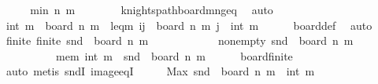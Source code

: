 \begin{isabellebody}
\ \ \isamarkupfalse%
\ \isamarkupfalse%
\ {\isachardoublequoteopen}min\ n\ m\ {\isasymge}\ {}{\isachardoublequoteclose}\isanewline
\ \ \ \ \isamarkupfalse%
\ knights{\isacharunderscore}{\kern0pt}path{\isacharunderscore}{\kern0pt}board{\isacharunderscore}{\kern0pt}m{\isacharunderscore}{\kern0pt}n{\isacharunderscore}{\kern0pt}geq{\isacharunderscore}{\kern0pt}{}\ \isamarkupfalse%
\ auto\isanewline
\ \ \isamarkupfalse%
\ \isamarkupfalse%
\ {\isachardoublequoteopen}{\isacharparenleft}{\kern0pt}{}{\isacharcomma}{\kern0pt}int\ m{\isacharparenright}{\kern0pt}\ {\isasymin}\ board\ n\ m{\isachardoublequoteclose}\ \ leq{\isacharunderscore}{\kern0pt}m{\isacharcolon}{\kern0pt}\ {\isachardoublequoteopen}{\isasymforall}{\isacharparenleft}{\kern0pt}i{\isacharcomma}{\kern0pt}j{\isacharparenright}{\kern0pt}\ {\isasymin}\ board\ n\ m{\isachardot}{\kern0pt}\ j\ {\isasymle}\ int\ m{\isachardoublequoteclose}\isanewline
\ \ \ \ \isamarkupfalse%
\ board{\isacharunderscore}{\kern0pt}def\ \isamarkupfalse%
\ auto\isanewline
\ \ \isamarkupfalse%
\ \isamarkupfalse%
\ finite{\isacharcolon}{\kern0pt}\ {\isachardoublequoteopen}finite\ {\isacharparenleft}{\kern0pt}{\isacharparenleft}{\kern0pt}snd{\isacharparenright}{\kern0pt}\ {\isacharbackquote}{\kern0pt}\ board\ n\ m{\isacharparenright}{\kern0pt}{\isachardoublequoteclose}\ \ \isanewline
\ \ \ \ \ \ \ \ \ \ non{\isacharunderscore}{\kern0pt}empty{\isacharcolon}{\kern0pt}\ {\isachardoublequoteopen}{\isacharparenleft}{\kern0pt}snd{\isacharparenright}{\kern0pt}\ {\isacharbackquote}{\kern0pt}\ board\ n\ m\ {\isasymnoteq}\ {\isacharbraceleft}{\kern0pt}{\isacharbraceright}{\kern0pt}{\isachardoublequoteclose}\ \isanewline
\ \ \ \ \ \ \ \ \ \ mem{\isacharunderscore}{\kern0pt}{}{\isacharcolon}{\kern0pt}\ {\isachardoublequoteopen}int\ m\ {\isasymin}\ {\isacharparenleft}{\kern0pt}snd{\isacharparenright}{\kern0pt}\ {\isacharbackquote}{\kern0pt}\ board\ n\ m{\isachardoublequoteclose}\isanewline
\ \ \ \ \isamarkupfalse%
\ board{\isacharunderscore}{\kern0pt}finite\ \isamarkupfalse%
\ auto\ {\isacharparenleft}{\kern0pt}metis\ sndI\ image{\isacharunderscore}{\kern0pt}eqI{\isacharparenright}{\kern0pt}\isanewline
\ \ \isamarkupfalse%
\ \isamarkupfalse%
\ {\isachardoublequoteopen}Max\ {\isacharparenleft}{\kern0pt}{\isacharparenleft}{\kern0pt}snd{\isacharparenright}{\kern0pt}\ {\isacharbackquote}{\kern0pt}\ board\ n\ m{\isacharparenright}{\kern0pt}\ {\isacharequal}{\kern0pt}\ int\ m{\isachardoublequoteclose}\isanewline

\end{isabellebody}
